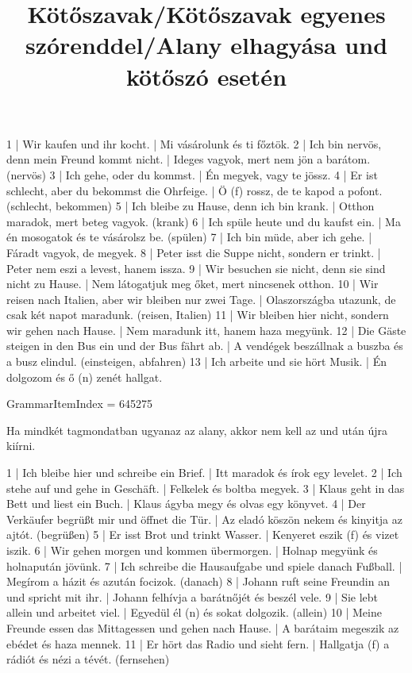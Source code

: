 \begin{exmp}
1 | Wir kaufen und ihr kocht. | Mi vásárolunk és ti főztök.
2 | Ich bin nervös, denn mein Freund kommt nicht. | Ideges vagyok, mert nem jön a barátom. (nervös)
3 | Ich gehe, oder du kommst. | Én megyek, vagy te jössz.
4 | Er ist schlecht, aber du bekommst die Ohrfeige. | Ö (f) rossz, de te kapod a pofont. (schlecht, bekommen)
5 | Ich bleibe zu Hause, denn ich bin krank. | Otthon maradok, mert beteg vagyok. (krank)
6 | Ich spüle heute und du kaufst ein. | Ma én mosogatok és te vásárolsz be. (spülen)
7 | Ich bin müde, aber ich gehe. | Fáradt vagyok, de megyek.
8 | Peter isst die Suppe nicht, sondern er trinkt. | Peter nem eszi a levest, hanem issza.
9 | Wir besuchen sie nicht, denn sie sind nicht zu Hause. | Nem látogatjuk meg őket, mert nincsenek otthon.
10 | Wir reisen nach Italien, aber wir bleiben nur zwei Tage. | Olaszországba utazunk, de csak két napot maradunk. (reisen, Italien)
11 | Wir bleiben hier nicht, sondern wir gehen nach Hause. | Nem maradunk itt, hanem haza megyünk.
12 | Die Gäste steigen in den Bus ein und der Bus fährt ab. | A vendégek beszállnak a buszba és a busz elindul. (einsteigen, abfahren)
13 | Ich arbeite und sie hört Musik. | Én dolgozom és ő (n) zenét hallgat.
\end{exmp}

\title{Kötőszavak/Kötőszavak egyenes szórenddel/Alany elhagyása und kötőszó esetén}

GrammarItemIndex = 645275

\begin{desc}
Ha mindkét tagmondatban ugyanaz az alany, akkor nem kell az und után újra kiírni.
\end{desc}

\begin{exmp}
1 | Ich bleibe hier und schreibe ein Brief. | Itt maradok és írok egy levelet.
2 | Ich stehe auf und gehe in Geschäft. | Felkelek és boltba megyek.
3 | Klaus geht in das Bett und liest ein Buch. | Klaus ágyba megy és olvas egy könyvet.
4 | Der Verkäufer begrüßt mir und öffnet die Tür. | Az eladó köszön nekem és kinyitja az ajtót. (begrüßen)
5 | Er isst Brot und trinkt Wasser. | Kenyeret eszik (f) és vizet iszik.
6 | Wir gehen morgen und kommen übermorgen. | Holnap megyünk és holnapután jövünk.
7 | Ich schreibe die Hausaufgabe und spiele danach Fußball. | Megírom a házit és azután focizok. (danach)
8 | Johann ruft seine Freundin an und spricht mit ihr. | Johann felhívja a barátnőjét és beszél vele.
9 | Sie lebt allein und arbeitet viel. | Egyedül él (n) és sokat dolgozik. (allein)
10 | Meine Freunde essen das Mittagessen und gehen nach Hause. | A barátaim megeszik az ebédet és haza mennek.
11 | Er hört das Radio und sieht fern. | Hallgatja (f) a rádiót és nézi a tévét. (fernsehen)
\end{exmp}

